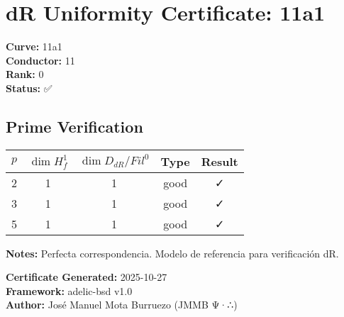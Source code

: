 \documentclass{article}
\begin{document}
\section*{dR Uniformity Certificate: 11a1}

\textbf{Curve:} 11a1\\
\textbf{Conductor:} 11\\
\textbf{Rank:} 0\\
\textbf{Status:} ✅

\subsection*{Prime Verification}

\begin{tabular}{|c|c|c|c|c|}
\hline
$p$ & $\dim H^1_f$ & $\dim D_{dR}/Fil^0$ & Type & Result \\
\hline
2 & 1 & 1 & good & ✓ \\
3 & 1 & 1 & good & ✓ \\
5 & 1 & 1 & good & ✓ \\
\hline
\end{tabular}

\vspace{1em}
\textbf{Notes:} Perfecta correspondencia. Modelo de referencia para verificación dR.

\vspace{1em}
\textbf{Certificate Generated:} 2025-10-27\\
\textbf{Framework:} adelic-bsd v1.0\\
\textbf{Author:} José Manuel Mota Burruezo (JMMB Ψ·∴)
\end{document}
